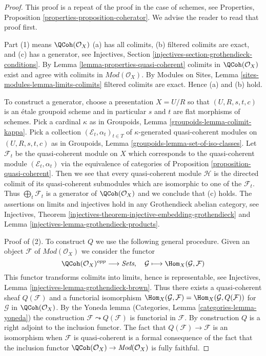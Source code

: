 \begin{proof}
This proof is a repeat of the proof in the case of schemes, see
Properties, Proposition \ref{properties-proposition-coherator}.
We advise the reader to read that proof first.

\medskip\noindent
Part (1) means $\QCoh(\mathcal{O}_X)$ (a) has all colimits,
(b) filtered colimits are exact, and (c) has a generator, see
Injectives, Section \ref{injectives-section-grothendieck-conditions}.
By Lemma \ref{lemma-properties-quasi-coherent}
colimits in $\QCoh(\mathcal{O}_X)$ exist and agree
with colimits in $\textit{Mod}(\mathcal{O}_X)$. By
Modules on Sites, Lemma \ref{sites-modules-lemma-limits-colimits}
filtered colimits are exact. Hence (a) and (b) hold.

\medskip\noindent
To construct a generator, choose a presentation $X = U/R$ so that
$(U, R, s, t, c)$ is an
\'etale groupoid scheme and in particular $s$ and $t$ are flat morphisms
of schemes. Pick a cardinal $\kappa$ as in
Groupoids, Lemma \ref{groupoids-lemma-colimit-kappa}.
Pick a collection $(\mathcal{E}_t, \alpha_t)_{t \in T}$ of
$\kappa$-generated quasi-coherent modules on
$(U, R, s, t, c)$ as in
Groupoids, Lemma \ref{groupoids-lemma-set-of-iso-classes}.
Let $\mathcal{F}_t$ be the quasi-coherent module on $X$ which
corresponds to the quasi-coherent module $(\mathcal{E}_t, \alpha_t)$ via
the equivalence of categories of
Proposition \ref{proposition-quasi-coherent}.
Then we see that every quasi-coherent module $\mathcal{H}$ is the
directed colimit of its quasi-coherent submodules which are isomorphic
to one of the $\mathcal{F}_t$. Thus $\bigoplus_t \mathcal{F}_t$ is
a generator of $\QCoh(\mathcal{O}_X)$ and we conclude that (c) holds.
The assertions on limits and injectives hold in any
Grothendieck abelian category, see
Injectives, Theorem
\ref{injectives-theorem-injective-embedding-grothendieck} and
Lemma \ref{injectives-lemma-grothendieck-products}.

\medskip\noindent
Proof of (2). To construct $Q$ we use the following general procedure.
Given an object $\mathcal{F}$ of $\textit{Mod}(\mathcal{O}_X)$
we consider the functor
$$
\QCoh(\mathcal{O}_X)^{opp} \longrightarrow \textit{Sets},\quad
\mathcal{G} \longmapsto \Hom_X(\mathcal{G}, \mathcal{F})
$$
This functor transforms colimits into limits,
hence is representable, see
Injectives, Lemma \ref{injectives-lemma-grothendieck-brown}.
Thus there exists a quasi-coherent sheaf $Q(\mathcal{F})$
and a functorial isomorphism
$\Hom_X(\mathcal{G}, \mathcal{F}) = \Hom_X(\mathcal{G}, Q(\mathcal{F}))$
for $\mathcal{G}$ in $\QCoh(\mathcal{O}_X)$. By the Yoneda lemma
(Categories, Lemma \ref{categories-lemma-yoneda})
the construction $\mathcal{F} \leadsto Q(\mathcal{F})$ is
functorial in $\mathcal{F}$. By construction $Q$ is a right
adjoint to the inclusion functor.
The fact that $Q(\mathcal{F}) \to \mathcal{F}$ is an isomorphism
when $\mathcal{F}$ is quasi-coherent is a formal consequence of the fact
that the inclusion functor
$\QCoh(\mathcal{O}_X) \to \textit{Mod}(\mathcal{O}_X)$
is fully faithful.
\end{proof}






